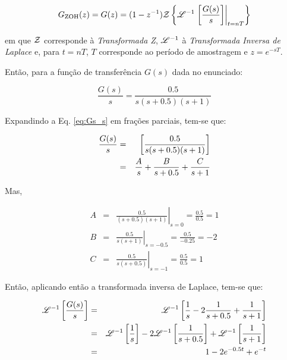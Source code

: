 \begin{equation}\label{eq:Gzoh}
G_{\text{ZOH}}(z) = 
G(z) = (1 - z^{-1})
       \mathcal{Z}\left\{\mathscr{L}^{-1}\left.\left[\frac{G(s)}{s}\right]\right|_{t = nT}\right\}
\end{equation}

\noindent em que $\mathcal{Z}$ corresponde à {\it Transformada Z}, $\mathscr{L}^{-1}$ à {\it
Transformada Inversa de Laplace} e, para $t = nT$, $T$ corresponde ao período de
amostragem e $z = e^{-sT}$.

Então, para a função de transferência $G(s)$ dada no enunciado:

\begin{equation}\label{eq:Gs_s}
\frac{G(s)}{s} = \frac{0.5}{s(s+0.5)(s+1)}
\end{equation}

Expandindo a Eq. \ref{eq:Gs_s} em frações parciais, tem-se que:

\begin{eqnarray}\label{eq:frac_parc}
\frac{G(s)}{s} & = & \left[\frac{0.5}{s(s+0.5)(s+1)}\right]\nonumber\\
& = & \frac{A}{s} + \frac{B}{s+0.5} + \frac{C}{s+1}\nonumber\\
\end{eqnarray}

Mas,

\begin{eqnarray}
A & = & \left.\frac{0.5}{(s+0.5)(s+1)}\right|_{s = 0} = \frac{0.5}{0.5} = 
                                                    1\nonumber\\
B & = & \left.\frac{0.5}{s(s+1)}\right|_{s = -0.5} = \frac{0.5}{-0.25} = 
                                                 -2\nonumber\\
C & = & \left.\frac{0.5}{s(s+0.5)}\right|_{s = -1} = \frac{0.5}{0.5} = 
                                                     1\nonumber
\end{eqnarray}

Então, aplicando então a transformada inversa de Laplace, tem-se que:

\begin{eqnarray}
\mathscr{L}^{-1}\left[\frac{G(s)}{s}\right]
& = & \mathscr{L}^{-1}\left[\frac{1}{s} - 
                         2\frac{1}{s+0.5} + 
                         \frac{1}{s+1}\right]\nonumber\\
& = & \mathscr{L}^{-1}\left[\frac{1}{s}\right] - 
      2\mathscr{L}^{-1}\left[\frac{1}{s+0.5}\right] + 
      \mathscr{L}^{-1}\left[\frac{1}{s+1}\right]\nonumber\\
& = & 1 - 2e^{-0.5t} + e^{-t}\label{eq:ilaplace}
\end{eqnarray}

